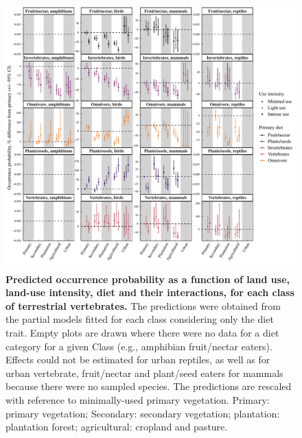 \begin{figure}[h!]
\centering
\includegraphics[scale=0.65]{figures/Chapter4/Figure3}
\caption[Predicted occurrence probability as a function of land use, land-use intensity, diet and their interactions, for each class of terrestrial vertebrates.]{\textbf{Predicted occurrence probability as a function of land use, land-use intensity, diet and their interactions, for each class of terrestrial vertebrates.} The predictions were obtained from the partial models fitted for each class considering only the diet trait. Empty plots are drawn where there were no data for a diet category for a given Class (e.g., amphibian fruit/nectar eaters). Effects could not be estimated for urban reptiles, as well as for urban vertebrate, fruit/nectar and plant/seed eaters for mammals because there were no sampled species. The predictions are rescaled with reference to minimally-used primary vegetation. Primary: primary vegetation; Secondary: secondary vegetation; plantation: plantation forest; agricultural: cropland and pasture.}
\label{chap4_fig3}
\end{figure}


